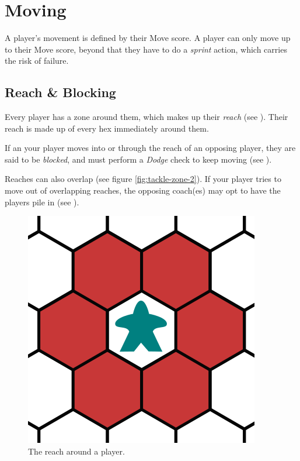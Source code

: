 \section{Moving} \label{moving}
A player's movement is defined by their Move score.
A player can only move up to their Move score, beyond that they have to do a \textit{sprint} action, which carries the risk of failure.

\subsection{Reach \& Blocking}
Every player has a zone around them, which makes up their \textit{reach} (see ).
Their reach is made up of every hex immediately around them.

If an your player moves into or through the reach of an opposing player, they are said to be \textit{blocked}, and must perform a \textit{Dodge} check to keep moving (see ).

\begin{note}
    Reaches can also overlap (see figure \ref{fig:tackle-zone-2}).
    If your player tries to move out of overlapping reaches, the opposing coach(es) may opt to have the players pile in (see ).
\end{note}

\begin{figure}
    \centering
    \includegraphics{graphics/tackle-zones-1.png}
    \caption{The reach around a player.}
    \label{fig:tackle-zone-1}
\end{figure}

